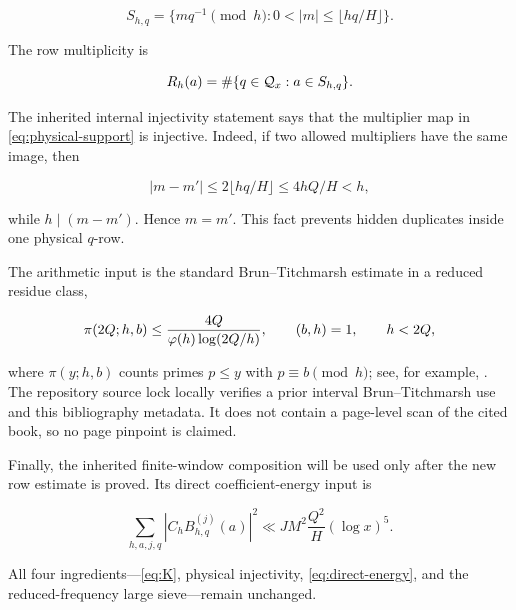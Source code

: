 \begin{equation}
 S_{h,q}=\{mq^{-1}\pmod h:0<|m|\leq\lfloor hq/H\rfloor\}.
 \label{eq:physical-support}
\end{equation}

The row multiplicity is

\begin{equation}
 R_h(a)=\#\{q\in\mathcal Q_x:a\in S_{h,q}\}.
 \label{eq:row-multiplicity}
\end{equation}

The inherited internal injectivity statement says that the multiplier map in
\eqref{eq:physical-support} is injective.  Indeed, if two allowed multipliers
have the same image, then

\[
 |m-m'|\leq2\lfloor hq/H\rfloor\leq4hQ/H<h,
\]

while $h\mid(m-m')$.  Hence $m=m'$.  This fact prevents hidden duplicates
inside one physical $q$-row.

The arithmetic input is the standard Brun--Titchmarsh estimate in a reduced
residue class,

\begin{equation}
 \pi(2Q;h,b)\leq
 \frac{4Q}{\varphi(h)\log(2Q/h)},
 \qquad (b,h)=1,\qquad h<2Q,
 \label{eq:BT-standard}
\end{equation}

where $\pi(y;h,b)$ counts primes $p\leq y$ with
$p\equiv b\pmod h$; see, for example,
\citet{MontgomeryVaughan2007}.  The repository source lock locally verifies a
prior interval Brun--Titchmarsh use and this bibliography metadata.  It does
not contain a page-level scan of the cited book, so no page pinpoint is
claimed.

Finally, the inherited finite-window composition will be used only after the
new row estimate is proved.  Its direct coefficient-energy input is

\begin{equation}
 \sum_{h,a,j,q}|C_hB_{h,q}^{(j)}(a)|^2
 \ll JM^2\frac{Q^2}{H}(\log x)^5.
 \label{eq:direct-energy}
\end{equation}

All four ingredients---\eqref{eq:K}, physical injectivity,
\eqref{eq:direct-energy}, and the reduced-frequency large sieve---remain
unchanged.
